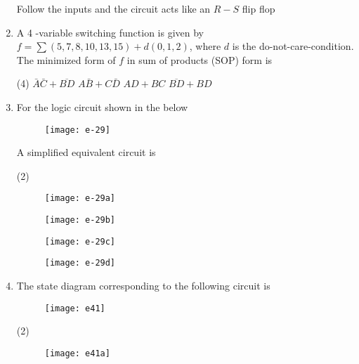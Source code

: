\begin{enumerate}
\begin{tasks}
		\task[\textbf{D.}] Follow the inputs and the circuit acts like an $R-S$ flip flop
	\end{tasks}
	\item A 4 -variable switching function is given by $f=\sum(5,7,8,10,13,15)+d(0,1,2)$, where $d$ is the do-not-care-condition. The minimized form of $f$ in sum of products (SOP) form is
	{}
	\begin{tasks}(4)
		\task[\textbf{A.}] $\bar{A} \bar{C}+\overline{B D}$
		\task[\textbf{B.}] $A \bar{B}+C \bar{D}$
		\task[\textbf{C.}]  $A D+B C$
		\task[\textbf{D.}] $\overline{B D}+B D$
	\end{tasks}
	\item For the logic circuit shown in the below\\
	\begin{figure}[H]
		\centering
		\texttt{[image: e-29]}
	\end{figure}
	A simplified equivalent circuit is
	{	}
	\begin{tasks}(2)
		\task[\textbf{A.}] 
		\begin{figure}[H]
			\centering
			\texttt{[image: e-29a]}
		\end{figure}
		\task[\textbf{B.}] \begin{figure}[H]
			\centering
			\texttt{[image: e-29b]}
		\end{figure}
		\task[\textbf{C.}] \begin{figure}[H]
			\centering
			\texttt{[image: e-29c]}
		\end{figure}
		\task[\textbf{D.}] \begin{figure}[H]
			\centering
			\texttt{[image: e-29d]}
		\end{figure}
	\end{tasks}
	\item The state diagram corresponding to the following circuit is
	{	}
	\begin{figure}[H]
		\centering
		\texttt{[image: e41]}
	\end{figure}
	\begin{tasks}(2)
		\task[\textbf{A.}] \begin{figure}[H]
			\centering
			\texttt{[image: e41a]}
		\end{figure}
		\task[\textbf{B.}] \begin{figure}[H]

\end{figure}
\end{tasks}
\end{enumerate}
